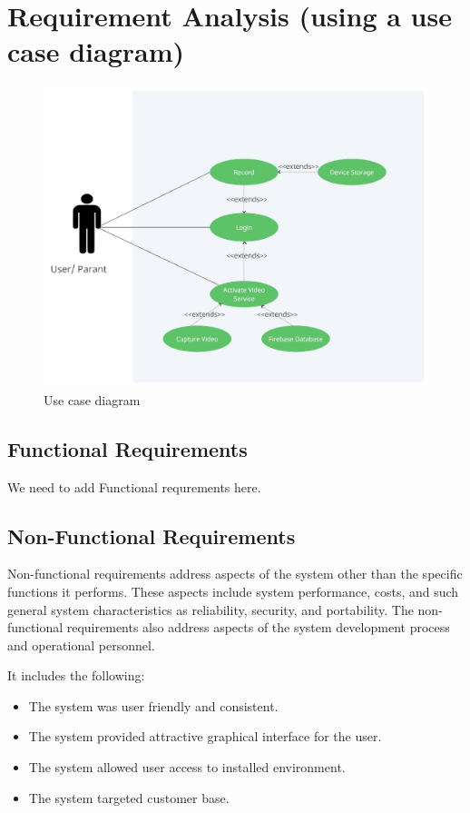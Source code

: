 \section{Requirement Analysis (using a use case diagram)}

\begin{figure}[h]
    \centering
    \includegraphics[width=1\textwidth]{b1.jpeg}
    \caption{Use case diagram}
    \label{Use case diagram}
\end{figure}

\subsection{Functional Requirements}
\par We need to add Functional requrements here.

\subsection{Non-Functional Requirements}
\par Non-functional requirements address aspects of the system other than the specific
functions it performs. These aspects include system performance, costs, and such
general system characteristics as reliability, security, and portability. The non-
functional requirements also address aspects of the system development process
and operational personnel. 
\par It includes the following:
\begin{itemize}
	\item The system was user friendly and consistent.
	\item The system provided attractive graphical interface for the user.
	\item The system allowed user access to installed environment.
	\item The system targeted customer base.
\end{itemize}

